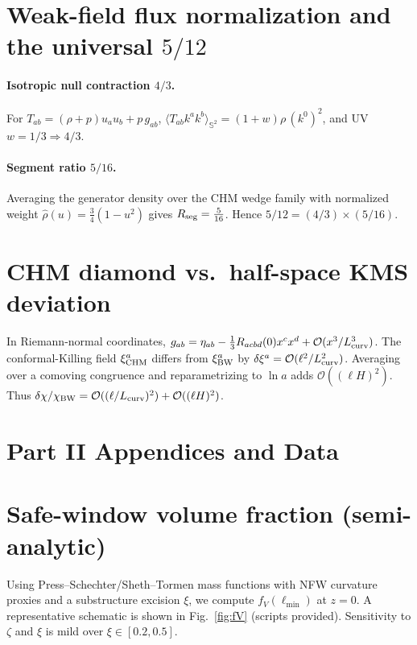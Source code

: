 \documentclass[aps,prd,onecolumn,superscriptaddress,nofootinbib]{revtex4-2}
\begin{document}
\section{Weak-field flux normalization and the universal \texorpdfstring{$5/12$}{5/12}}
\label{app:five-twelve}
\paragraph{Isotropic null contraction \(4/3\).} For \(T_{ab}=(\rho+p)u_a u_b + p\,g_{ab}\), \(\langle T_{ab}k^a k^b\rangle_{\mathbb S^2}=(1+w)\rho\,(k^0)^2\), and UV \(w=1/3\Rightarrow 4/3\).
\paragraph{Segment ratio \(5/16\).} Averaging the generator density over the CHM wedge family with normalized weight \(\hat\rho(u)=\tfrac{3}{4}(1-u^2)\) gives \(R_{\rm seg}=\frac{5}{16}\). Hence \(5/12=(4/3)\times(5/16)\).

\section{CHM diamond vs.\ half-space KMS deviation}
\label{app:chm-kms-estimate}
In Riemann-normal coordinates,
\(g_{ab}=\eta_{ab}-\tfrac{1}{3}R_{acbd}(0)x^c x^d+\mathcal O(x^3/L_{\rm curv}^3)\).
The conformal-Killing field \(\xi^a_{\rm CHM}\) differs from \(\xi^a_{\rm BW}\) by \(\delta\xi^a=\mathcal O(\ell^2/L_{\rm curv}^2)\).
Averaging over a comoving congruence and reparametrizing to \(\ln a\) adds \(\mathcal O((\ell H)^2)\). Thus
\(\delta\chi/\chi_{\rm BW}=\mathcal O((\ell/L_{\rm curv})^2)+\mathcal O((\ell H)^2)\).

\section*{Part II Appendices and Data}

\section{Safe-window volume fraction (semi-analytic)}
\label{app:fv}
Using Press--Schechter/Sheth--Tormen mass functions with NFW curvature proxies and a substructure excision \(\xi\), we compute \(f_V(\ell_{\min})\) at \(z\!=\!0\). A representative schematic is shown in Fig.~\ref{fig:fV} (scripts provided). Sensitivity to \(\zeta\) and \(\xi\) is mild over \(\xi\in[0.2,0.5]\).
\end{document}
